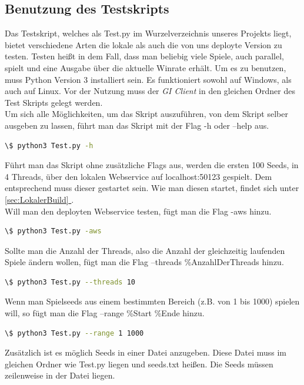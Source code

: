 \documentclass{article}
\newcommand{\fullref}[1]{\hyperref[{#1}]{\ref{#1} \nameref{#1}}} %
\newcommand{\gquote}[1]{\glqq #1\grqq} %
\let\oldgls\gls
\renewcommand{\gls}[1]{\emph{\oldgls{#1}}} %
\begin{document}
\subsection{Benutzung des Testskripts}
\label{sec:TestskriptNutzung}
Das Testskript, welches als Test.py im Wurzelverzeichnis unseres Projekts liegt, bietet verschiedene Arten die lokale als auch die von uns deployte Version zu testen. Testen heißt in dem Fall, dass man beliebig viele Spiele, auch parallel, spielt und eine Ausgabe über die aktuelle Winrate erhält. Um es zu benutzen, muss Python Version 3 installiert sein. Es funktioniert sowohl auf Windows, als auch auf Linux. Vor der Nutzung muss der \gls{GI Client} in den gleichen Ordner des Test Skripts gelegt werden.\\
Um sich alle Möglichkeiten, um das Skript auszuführen, von dem Skript selber ausgeben zu lassen, führt man das Skript mit der Flag \gquote{-h} oder \gquote{--help} aus.
\begin{lstlisting}[language=bash, basicstyle=\footnotesize, numbers=none]
  \$ python3 Test.py -h
\end{lstlisting}
Führt man das Skript ohne zusätzliche Flags aus, werden die ersten 100 Seeds, in 4 Threads, über den lokalen Webservice auf localhost:50123 gespielt. Dem entsprechend muss dieser gestartet sein. Wie man diesen startet, findet sich unter \fullref{sec:LokalerBuild}. \\
Will man den deployten Webservice testen, fügt man die Flag \gquote{-aws} hinzu.
\begin{lstlisting}[language=bash, basicstyle=\footnotesize, numbers=none]
  \$ python3 Test.py -aws
\end{lstlisting}
Sollte man die Anzahl der Threads, also die Anzahl der gleichzeitig laufenden Spiele ändern wollen, fügt man die Flag --threads \%AnzahlDerThreads hinzu.
\begin{lstlisting}[language=bash, basicstyle=\footnotesize, numbers=none]
  \$ python3 Test.py --threads 10
\end{lstlisting}
Wenn man Spielseeds aus einem bestimmten Bereich (z.B. von 1 bis 1000) spielen will, so fügt man die Flag --range \%Start \%Ende hinzu.
\begin{lstlisting}[language=bash, basicstyle=\footnotesize, numbers=none]
  \$ python3 Test.py --range 1 1000
\end{lstlisting}
Zusätzlich ist es möglich Seeds in einer Datei anzugeben. Diese Datei muss im gleichen Ordner wie Test.py liegen und seeds.txt heißen. Die Seeds müssen zeilenweise in der Datei liegen.
\end{document}
